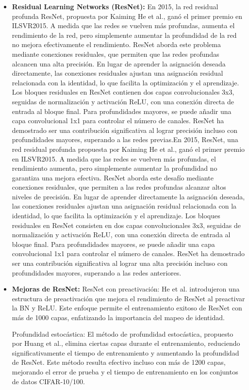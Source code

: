 \begin{itemize}
	\item \textbf{Residual Learning Networks (ResNet):} En 2015, la red residual profunda ResNet, propuesta por Kaiming He et al., ganó el primer premio en ILSVR2015. A medida que las redes se vuelven más profundas, aumenta el rendimiento de la red, pero simplemente aumentar la profundidad de la red no mejora efectivamente el rendimiento. ResNet aborda este problema mediante conexiones residuales, que permiten que las redes profundas alcancen una alta precisión. En lugar de aprender la asignación deseada directamente, las conexiones residuales ajustan una asignación residual relacionada con la identidad, lo que facilita la optimización y el aprendizaje. Los bloques residuales en ResNet contienen dos capas convolucionales 3x3, seguidas de normalización y activación ReLU, con una conexión directa de entrada al bloque final. Para profundidades mayores, se puede añadir una capa convolucional 1x1 para controlar el número de canales. ResNet ha demostrado ser una contribución significativa al lograr precisión incluso con profundidades mayores, superando a las redes previas.En 2015, ResNet, una red residual profunda propuesta por Kaiming He et al., ganó el primer premio en ILSVR2015. A medida que las redes se vuelven más profundas, el rendimiento aumenta, pero simplemente aumentar la profundidad no garantiza una mejora efectiva. ResNet aborda este desafío mediante conexiones residuales, que permiten a las redes profundas alcanzar altos niveles de precisión. En lugar de aprender directamente la asignación deseada, las conexiones residuales ajustan una asignación residual relacionada con la identidad, lo que facilita la optimización y el aprendizaje. Los bloques residuales en ResNet consisten en dos capas convolucionales 3x3, seguidas de normalización y activación ReLU, con una conexión directa de entrada al bloque final. Para profundidades mayores, se puede añadir una capa convolucional 1x1 para controlar el número de canales. ResNet ha demostrado ser una contribución significativa al lograr una alta precisión incluso con profundidades mayores, superando a las redes anteriores.
	
	\item \textbf{Mejoras de ResNet:}
	ResNet con preactivación: He et al. introdujeron una estructura de preactivación que mejora el rendimiento de ResNet al preactivar la BN y ReLU. Este enfoque permite el entrenamiento exitoso de ResNet con más de 1000 capas, enfatizando la importancia del mapeo de identidad.
	
	Profundidad estocástica: El método de profundidad estocástica, propuesto por Huang et al., elimina ciertas capas durante el entrenamiento, reduciendo significativamente el tiempo de entrenamiento y aumentando la profundidad de ResNet. Este método resulta efectivo incluso con más de 1200 capas, mejorando el error de prueba y el tiempo de entrenamiento en los conjuntos de datos CIFAR-10/100.
	

\end{itemize}
